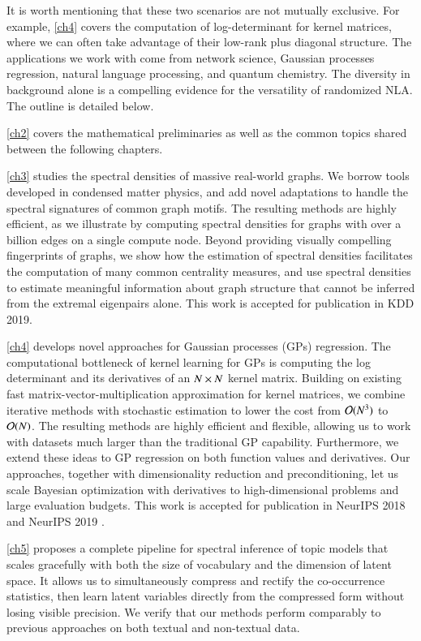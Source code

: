 It is worth mentioning that these two scenarios are not mutually exclusive. For
example, \cref{ch4} covers the computation of log\hyp{}determinant for kernel
matrices, where we can often take advantage of their low\hyp{}rank plus diagonal
structure. The applications we work with come from network science, Gaussian
processes regression, natural language processing, and quantum chemistry. The
diversity in background alone is a compelling evidence for the versatility of
randomized NLA. The outline is detailed below.

\cref{ch2} covers the mathematical preliminaries as well as the common topics
shared between the following chapters.

\cref{ch3} studies the spectral densities of massive real-world graphs. We
borrow tools developed in condensed matter physics, and add novel adaptations to
handle the spectral signatures of common graph motifs.  The resulting methods
are highly efficient, as we illustrate by computing spectral densities for
graphs with over a billion edges on a single compute node. Beyond providing
visually compelling fingerprints of graphs, we show how the  estimation of
spectral densities facilitates the computation of many common centrality
measures, and use spectral densities to estimate meaningful information about
graph structure that cannot be inferred from the extremal eigenpairs alone. This
work is accepted for publication in KDD 2019\cite{dong2019network}.

\cref{ch4} develops novel approaches for Gaussian processes (GPs) regression.
The computational bottleneck of kernel learning for GPs is computing the log
determinant and its derivatives of an $N\mathbin{\times} N$ kernel matrix. Building on
existing fast matrix-vector-multiplication approximation for kernel
matrices, we combine iterative methods with stochastic estimation to
lower the cost from $\mathcal{O}(N^3)$ to $\mathcal{O}(N)$. The resulting methods are highly
efficient and flexible, allowing us to work with datasets much larger than
the traditional GP capability. Furthermore, we extend these ideas to GP
regression on both function values and derivatives. Our approaches, together
with dimensionality reduction and preconditioning, let us scale Bayesian
optimization with derivatives to high\hyp{}dimensional problems and large
evaluation budgets. This work is accepted for publication in NeurIPS 2018
\cite{dong2017scalable} and NeurIPS 2019 \cite{eriksson2018scaling}.

\cref{ch5} proposes a complete pipeline for spectral inference of topic
models that scales gracefully with both the size of vocabulary and the dimension
of latent space. It allows us to simultaneously compress and rectify the 
co\hyp{}occurrence statistics, then learn latent variables directly from the
compressed form without losing visible precision. We verify that our
methods perform comparably to previous approaches on both textual and
non\hyp{}textual data.

